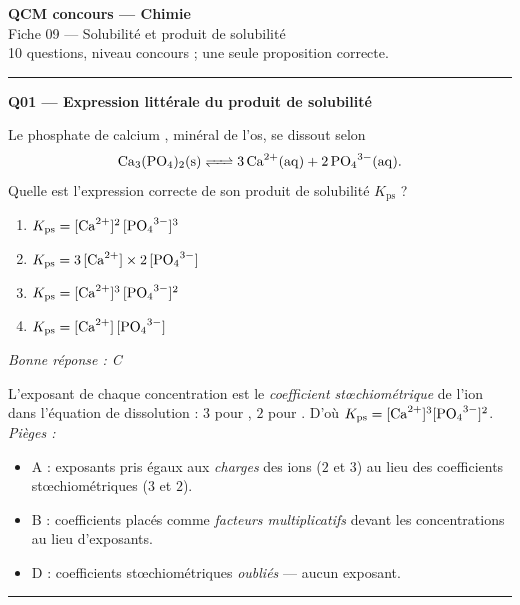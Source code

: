 \documentclass[11pt,a4paper]{article}
\begin{document}
\begin{center}
{\Large\bfseries QCM concours --- Chimie}\\[2pt]
{\large Fiche 09 --- Solubilité et produit de solubilité}\\[2pt]
{\small 10 questions, niveau concours ; une seule proposition correcte.}
\end{center}
\vspace{4pt}\hrule\vspace{10pt}

\noindent\textbf{Q01 --- Expression littérale du produit de solubilité}\par
Le phosphate de calcium , minéral de l'os, se dissout selon
\[\ce{Ca3(PO4)2(s) <=> 3 Ca^{2+}(aq) + 2 PO4^{3-}(aq)}.\]
Quelle est l'expression correcte de son produit de solubilité $K_{\mathrm{ps}}$ ?
\begin{enumerate}[label=\Alph*)]
\item $K_{\mathrm{ps}} = [\ce{Ca^{2+}}]^{2}\,[\ce{PO4^{3-}}]^{3}$
\item $K_{\mathrm{ps}} = 3\,[\ce{Ca^{2+}}]\times 2\,[\ce{PO4^{3-}}]$
\item $K_{\mathrm{ps}} = [\ce{Ca^{2+}}]^{3}\,[\ce{PO4^{3-}}]^{2}$
\item $K_{\mathrm{ps}} = [\ce{Ca^{2+}}]\,[\ce{PO4^{3-}}]$
\end{enumerate}
\textit{Bonne réponse : C}\par
L'exposant de chaque concentration est le \emph{coefficient stœchiométrique} de l'ion dans l'équation
de dissolution : $3$ pour , $2$ pour . D'où
$K_{\mathrm{ps}} = [\ce{Ca^{2+}}]^{3}[\ce{PO4^{3-}}]^{2}$.
\textit{Pièges :}
\begin{itemize}
\item A : exposants pris égaux aux \emph{charges} des ions ($2$ et $3$) au lieu des coefficients stœchiométriques ($3$ et $2$).
\item B : coefficients placés comme \emph{facteurs multiplicatifs} devant les concentrations au lieu d'exposants.
\item D : coefficients stœchiométriques \emph{oubliés} — aucun exposant.
\end{itemize}
\vspace{6pt}\hrule\vspace{8pt}
\end{document}
